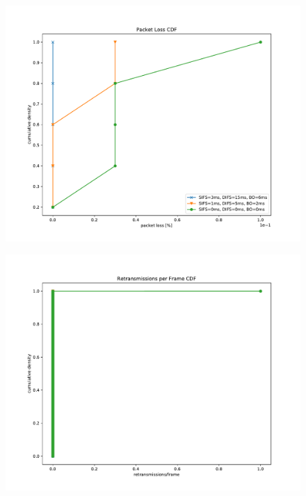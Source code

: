 \documentclass{article}
\begin{document}
	
\begin{figure}
	\includegraphics[width=\textwidth]{cdf/packet_loss_cdf}
\end{figure}

\begin{figure}
	\includegraphics[width=\textwidth]{cdf/retransmissions_per_frame_cdf}
\end{figure}
\end{document}
